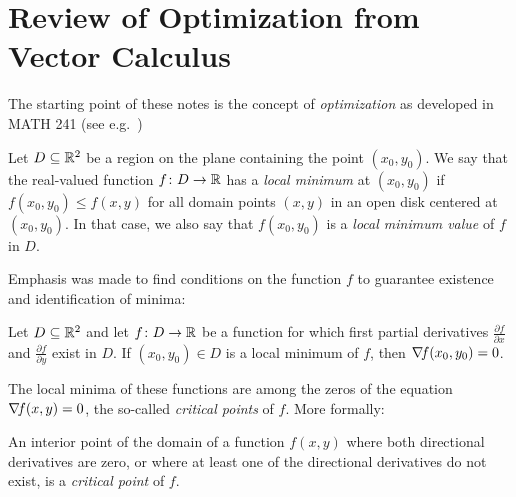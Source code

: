 
\chapter{Review of Optimization from Vector Calculus}\label{chapter:intro}

The starting point of these notes is the concept of \emph{optimization} as developed in MATH 241 (see e.g.~\cite[Chapter~14]{finney2001thomas})

\begin{definition}\label{def:localminimum}
Let $D\subseteq \mathbb{R}^2$ be a region on the plane containing the point $(x_0, y_0)$.  We say that the real-valued function $f\colon D \to \mathbb{R}$ has a \emph{local minimum} at $(x_0,y_0)$ if $f(x_0,y_0) \leq f(x,y)$ for all domain points $(x,y)$ in an open disk centered at $(x_0,y_0)$.  In that case, we also say that $f(x_0,y_0)$ is a \emph{local minimum value} of $f$ in $D$.
\end{definition}

Emphasis was made to find conditions on the function $f$ to guarantee existence and identification of minima:

\begin{theorem}\label{theorem:localminimum}
Let $D \subseteq \mathbb{R}^2$ and let $f \colon D \to \mathbb{R}$ be a function for which first partial derivatives $\frac{\partial f}{\partial x}$ and $\frac{\partial f}{\partial y}$ exist in $D$.  If $(x_0,y_0) \in D$ is a local minimum of $f$, then $\mathop{\nabla\! {f}}(x_0,y_0)=0$.
\end{theorem}

The local minima of these functions are among the zeros of the equation $\mathop{\nabla\! {f}}(x,y)=0$, the so-called \emph{critical points} of $f$. More formally:

\begin{definition}\label{def:criticalpoint}
An interior point of the domain of a function $f(x,y)$ where both directional derivatives are zero, or where at least one of the directional derivatives do not exist, is a \emph{critical point} of $f$.
\end{definition}

